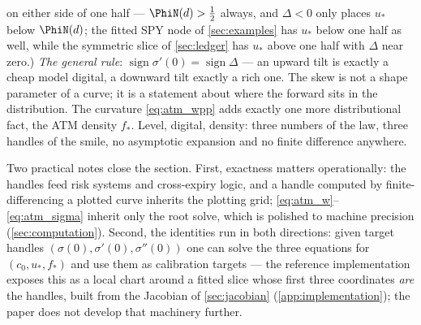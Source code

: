 on either side of one half --- $\PhiN(d)>\tfrac12$ always, and $\Delta<0$
only places $u_*$ below $\PhiN(d)$; the fitted SPY node of
\cref{sec:examples} has $u_*$ below one half as well, while the
symmetric slice of \cref{sec:ledger} has $u_*$ above one half with
$\Delta$ near zero.)  \emph{The general rule}:
$\operatorname{sign}\sigma'(0)=\operatorname{sign}\Delta$ --- an upward
tilt is exactly a cheap model digital, a downward tilt exactly a rich
one.  The skew is not a shape parameter of a curve; it is a statement
about where the forward sits in the distribution.  The curvature
\eqref{eq:atm_wpp} adds exactly one more distributional fact, the ATM
density $f_*$.  Level, digital, density: three numbers of the law, three
handles of the smile, no asymptotic expansion and no finite difference
anywhere.

Two practical notes close the section.  First, exactness matters
operationally: the handles feed risk systems and cross-expiry logic, and a
handle computed by finite-differencing a plotted curve inherits the
plotting grid; \eqref{eq:atm_w}--\eqref{eq:atm_sigma} inherit only the
root solve, which is polished to machine precision
(\cref{sec:computation}).  Second, the identities run in both directions:
given target handles $(\sigma(0),\sigma'(0),\sigma''(0))$ one can solve
the three equations for $(c_0,u_*,f_*)$ and use them as calibration
targets --- the reference implementation exposes this as a local chart
around a fitted slice whose first three coordinates \emph{are} the
handles, built from the Jacobian of \cref{sec:jacobian}
(\cref{app:implementation}); the paper does not develop that machinery
further.
